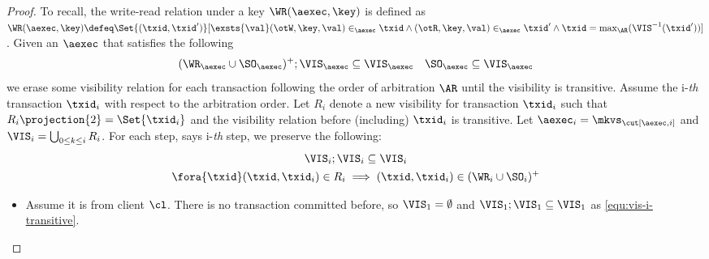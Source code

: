 \begin{proof}
    To recall, the write-read relation under a key \( \WR(\aexec, \key) \) is defined as 
    \( \WR(\aexec, \key) \defeq \Set{ (\txid, \txid') }[ \exsts{\val} (\otW, \key, \val) \in_\aexec \txid \land (\otR, \key, \val) \in_\aexec \txid' \land \txid = \max_\AR(\VIS^{-1}(\txid')) ]\).
    Given an \( \aexec \) that satisfies the following
    \[
        (\WR_\aexec \cup \SO_\aexec )^{+} ; \VIS_\aexec \subseteq \VIS_\aexec \quad \SO_\aexec \subseteq \VIS_\aexec
    \]
    we erase some visibility relation for each transaction following the order of arbitration \( \AR \) until the visibility is transitive.
    Assume the i-\emph{th} transaction \( \txid_i \)  with respect to the arbitration order.
    Let \( R_i \) denote a new visibility for transaction \( \txid_i \) such that
    \( R_i\projection{2} = \Set{\txid_i}\)
    and the visibility relation before (including) \( \txid_i \) is transitive.
    Let \( \aexec_i = \mkvs_{\cut[\aexec, i]} \) and \( \VIS_i = \bigcup_{0 \leq k \leq i} R_i \).
    For each step, says i-\emph{th} step, we  preserve the following:
    \begin{gather}
        \VIS_i ; \VIS_i \subseteq \VIS_i \label{equ:vis-i-transitive} \\
        \fora{\txid} (\txid,\txid_i) \in R_i \implies (\txid, \txid_i) \in (\WR_i \cup \SO_i)^{+}
        \label{equ:last-read-correct}
    \end{gather}
    
    \begin{itemize}
    \item {}
    Assume it is from client \( \cl \).
    There is no transaction committed before, so \( \VIS_1 = \emptyset \) and \( \VIS_1 ; \VIS_1 \subseteq \VIS_1 \) as \cref{equ:vis-i-transitive}.


\end{itemize}
\end{proof}
